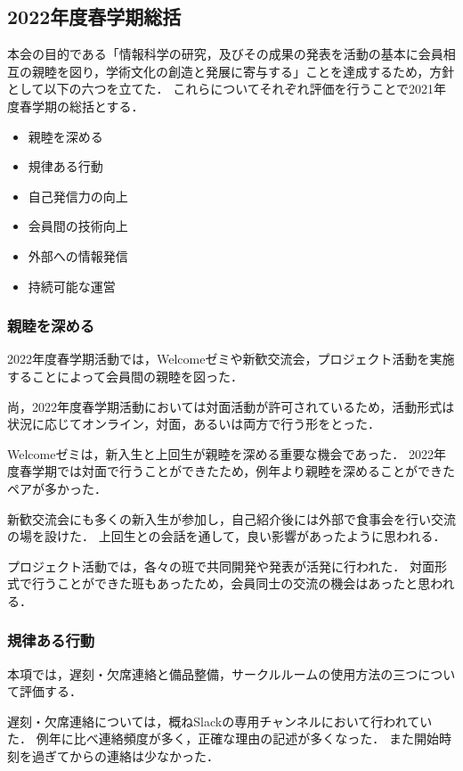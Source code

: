 \subsection*{2022年度春学期総括}


本会の目的である「情報科学の研究，及びその成果の発表を活動の基本に会員相互の親睦を図り，学術文化の創造と発展に寄与する」ことを達成するため，方針として以下の六つを立てた．
これらについてそれぞれ評価を行うことで2021年度春学期の総括とする．

\begin{itemize}
  \item 親睦を深める
  \item 規律ある行動
  \item 自己発信力の向上
  \item 会員間の技術向上
  \item 外部への情報発信
  \item 持続可能な運営
\end{itemize}

\subsubsection*{親睦を深める}
2022年度春学期活動では，Welcomeゼミや新歓交流会，プロジェクト活動を実施することによって会員間の親睦を図った．

尚，2022年度春学期活動においては対面活動が許可されているため，活動形式は状況に応じてオンライン，対面，あるいは両方で行う形をとった．

Welcomeゼミは，新入生と上回生が親睦を深める重要な機会であった．
2022年度春学期では対面で行うことができたため，例年より親睦を深めることができたペアが多かった．

新歓交流会にも多くの新入生が参加し，自己紹介後には外部で食事会を行い交流の場を設けた．
上回生との会話を通して，良い影響があったように思われる．

プロジェクト活動では，各々の班で共同開発や発表が活発に行われた．
対面形式で行うことができた班もあったため，会員同士の交流の機会はあったと思われる．

\subsubsection*{規律ある行動}
本項では，遅刻・欠席連絡と備品整備，サークルルームの使用方法の三つについて評価する．

遅刻・欠席連絡については，概ねSlackの専用チャンネルにおいて行われていた．
例年に比べ連絡頻度が多く，正確な理由の記述が多くなった．
また開始時刻を過ぎてからの連絡は少なかった．

